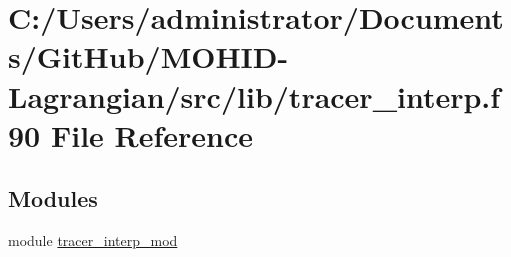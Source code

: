 \hypertarget{tracer__interp_8f90}{}\section{C\+:/\+Users/administrator/\+Documents/\+Git\+Hub/\+M\+O\+H\+I\+D-\/\+Lagrangian/src/lib/tracer\+\_\+interp.f90 File Reference}
\label{tracer__interp_8f90}
\subsection*{Modules}
\begin{DoxyCompactItemize}
\item 
module \mbox{\hyperlink{namespacetracer__interp__mod}{tracer\+\_\+interp\+\_\+mod}}
\end{DoxyCompactItemize}
